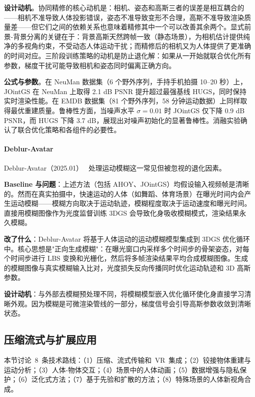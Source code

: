 \textbf{设计动机}。协同精修的核心动机是：相机、姿态和高斯三者的误差是相互耦合的——相机不准导致人体投影错误，姿态不准导致变形不合理，高斯不准导致渲染质量差——但它们之间的依赖关系也意味着精修其中一个可以改善其余两个。显式前景-背景分离的关键在于：背景高斯天然跨帧一致（静态场景），为相机估计提供纯净的多视角约束，不受动态人体运动干扰；而精修后的相机又为人体提供了更准确的时间对应。三阶段训练策略的动机是防止退化解：如果从一开始就联合优化所有参数，梯度干扰可能导致相机和姿态同时偏离正确方向。

\textbf{公式与参数}。在 NeuMan 数据集（6 个野外序列，手持手机拍摄 10--20 秒）上，JOintGS 在 NeuMan 上取得 2.1 dB PSNR 提升超过最强基线 HUGS，同时保持实时渲染性能。在 EMDB 数据集（81 个野外序列，58 分钟运动数据）上同样取得最优重建质量。鲁棒性方面，当噪声水平 $\sigma{=}0.01$ 时 JOintGS 仅下降 0.9 dB PSNR，而 HUGS 下降 3.7 dB，展现出对噪声初始化的显著鲁棒性。消融实验确认了联合优化策略和各组件的必要性。

\paragraph{Deblur-Avatar}

Deblur-Avatar（2025.01）~\cite{2501_13335} 处理运动模糊这一常见但被忽视的退化因素。

\textbf{Baseline 与问题}：上述方法（包括 AHOY、JOintGS）均假设输入视频帧是清晰的。然而在真实拍摄中，快速运动的人体（如舞蹈、体育场景）在曝光时间内会产生运动模糊——模糊方向取决于运动轨迹，模糊程度取决于运动速度和曝光时间。直接用模糊图像作为光度监督训练 3DGS 会导致化身吸收模糊模式，渲染结果永久模糊。

\textbf{改了什么}：Deblur-Avatar 将基于人体运动的运动模糊模型集成到 3DGS 优化循环中。核心思想是"正向生成模糊"：在曝光窗口内采样多个时间步的骨架姿态，对每个时间步进行 LBS 变换和光栅化，然后将多帧渲染结果平均合成模糊图像。生成的模糊图像与真实模糊输入比对，光度损失反向传播同时优化运动轨迹和 3D 高斯参数。

\textbf{设计动机}：与外部去模糊预处理不同，将模糊模型嵌入优化循环使化身直接学习清晰外观。因为模糊是可微渲染管线的一部分，梯度信号会引导高斯参数收敛到清晰状态。

\subsection{压缩流式与扩展应用}
\label{ss:16_2_压缩流式}

本节讨论~8~条技术路线：（1）压缩、流式传输和~VR~集成；（2）铰接物体重建与运动分析；（3）人体-物体交互；（4）场景中的人体动画；（5）数据增强与隐私保护；（6）泛化式方法；（7）基于先验和扩散的方法；（8）特殊场景的人体新视角合成。

